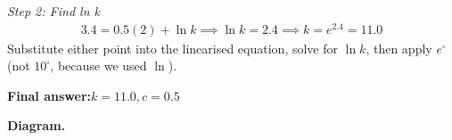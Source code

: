 \documentclass[11pt]{article}
\begin{document}
\textit{Step 2: Find ln k}
\[\begin{gathered}
3.4 = 0.5(2) + \ln k \implies \ln k = 2.4 \implies k = e^{2.4} = 11.0
\end{gathered}\]
Substitute either point into the linearised equation, solve for \( \ln k \), then apply \( e^{\square} \) (not \( 10^{\square} \), because we used \( \ln \)).

\begin{answerbox}
\textbf{Final answer:}\quad \(\displaystyle k = 11.0, c = 0.5\)
\end{answerbox}
\textbf{Diagram.}

\begin{center}
\end{center}
\end{document}
